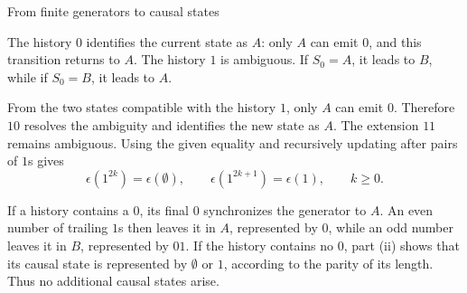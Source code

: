 \begin{exercise}[Extension]{From finite generators to causal states}
\begin{solution}
\begin{parts}
\begin{subparts}
{\par}
        \end{subparts}

      \item
        \begin{subparts}
          \item The history $0$ identifies the current state as $A$: only $A$
            can emit $0$, and this transition returns to $A$. The history $1$
            is ambiguous. If $S_0=A$, it leads to $B$, while if $S_0=B$, it
            leads to $A$.

          \item From the two states compatible with the history $1$, only $A$
            can emit $0$. Therefore $10$ resolves the ambiguity and identifies
            the new state as $A$. The extension $11$ remains ambiguous. Using
            the given equality and recursively updating after pairs of $1$s
            gives
            \[
              \epsilon(1^{2k})=\epsilon(\emptyset),
              \qquad
              \epsilon(1^{2k+1})=\epsilon(1),
              \qquad k\geq0.
            \]

          \item If a history contains a $0$, its final $0$ synchronizes the
            generator to $A$. An even number of trailing $1$s then leaves it
            in $A$, represented by $0$, while an odd number leaves it in $B$,
            represented by $01$. If the history contains no $0$, part (ii)
            shows that its causal state is represented by $\emptyset$ or $1$,
            according to the parity of its length. Thus no additional causal
            states arise.


\end{subparts}
\end{parts}
\end{solution}
\end{exercise}
